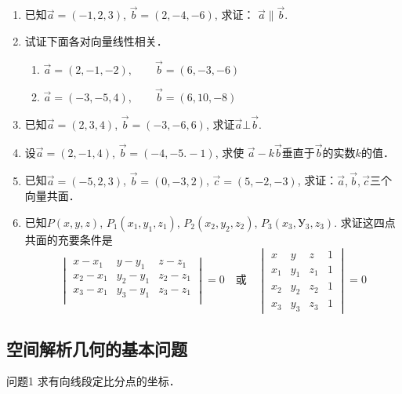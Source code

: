\begin{ex}
\begin{enumerate}
    \item 已知$\vec{a}=(-1,2,3)$, $\vec{b}=(2,-4,-6)$, 求证：
$\vec{a}\parallel \vec{b}$.
\item 试证下面各对向量线性相关．
\begin{enumerate}
    \item $\vec{a}=(2,-1,-2),\qquad \vec{b}=(6,-3,-6)$
    \item $\vec{a}=(-3,-5,4),\qquad   \vec{b}=(6,10,-8)$
\end{enumerate}

 \item 已知$\vec{a}=(2,3,4)$, $\vec{b}=(-3,-6,6)$, 求证$\vec{a}\bot \vec{b}$.

 \item 设$\vec{a}=(2,-1,4)$, $\vec{b}=(-4,-5.-1)$, 求使
 $\vec{a}-k\vec{b}$垂直于$\vec{b}$的实数$k$的值．

 \item 已知$\vec{a}=(-5,2,3)$, $\vec{b}=(0,-3,2)$, $\vec{c}=(5,
 -2,-3)$, 求证：$\vec{a},\vec{b},\vec{c}$三个向量共面．
\item 已知$P(x,y,z)$, $P_1(x_1,y_1,z_1)$, $P_2(x_2,y_2,
z_2)$, $P_3(x_3, У_3,z_3)$. 求证这四点共面的充要条件是
\[\begin{vmatrix}
    x-x_1 &y-y_1&z-z_1\\
    x_2-x_1 &y_2-y_1&z_2-z_1\\
    x_3-x_1 &y_3-y_1&z_3-z_1\\
\end{vmatrix}=0\quad \text{或}\quad \begin{vmatrix}
    x&y&z&1\\x_1 & y_1&z_1& 1\\
    x_2 & y_2&z_2& 1\\x_3 & y_3&z_3& 1
\end{vmatrix}=0\]
\end{enumerate}   
\end{ex}

\subsection{空间解析几何的基本问题}
\begin{blk}{问题1}
    求有向线段定比分点的坐标．
\end{blk}
 
